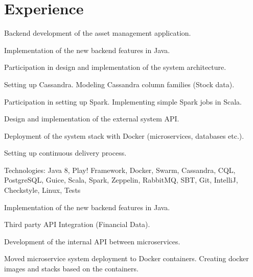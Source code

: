 \documentclass[]{deedy-resume-openfont}
\begin{document}
\begin{minipage}[t]{0.66\textwidth} 


\section{Experience}

Backend development of the asset management application. %
\vspace{\topsep} %
\begin{tightemize}
\item Implementation of the new backend features in Java.
\item Participation in design and implementation of the system architecture. 
\item Setting up Cassandra. Modeling Cassandra column families (Stock data).
\item Participation in setting up Spark. Implementing simple Spark jobs in Scala. 
\item Design and implementation of the external system API.
\item Deployment of the system stack with Docker (microservices, databases etc.).
\item Setting up continuous delivery process.
\end{tightemize}
Technologies: Java 8, Play! Framework, Docker, Swarm, Cassandra, CQL, PostgreSQL, Guice, Scala, Spark, Zeppelin, RabbitMQ, SBT, Git, IntelliJ, Checkstyle, Linux, Tests
\sectionsep

\begin{tightemize}
\item Implementation of the new backend features in Java.
\item Third party API Integration (Financial Data).
\item Development of the internal API between microservices.
\item Moved microservice system deployment to Docker containers. Creating docker images and stacks based on the containers.
\end{tightemize}
\sectionsep


\end{minipage}
\end{document}
